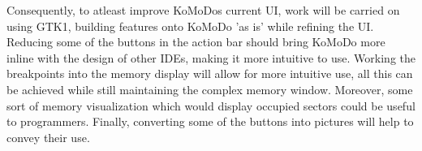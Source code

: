     Consequently, to atleast improve KoMoDos current UI, work will be carried on using GTK1, building features onto KoMoDo 'as is' while refining the UI. Reducing some of the buttons in the action bar should bring KoMoDo more inline with the design of other IDEs, making it more intuitive to use. Working the breakpoints into the memory display will allow for more intuitive use, all this can be achieved while still maintaining the complex memory window. Moreover, some sort of memory visualization which would display occupied sectors could be useful to programmers. Finally, converting some of the buttons into pictures will help to convey their use.
